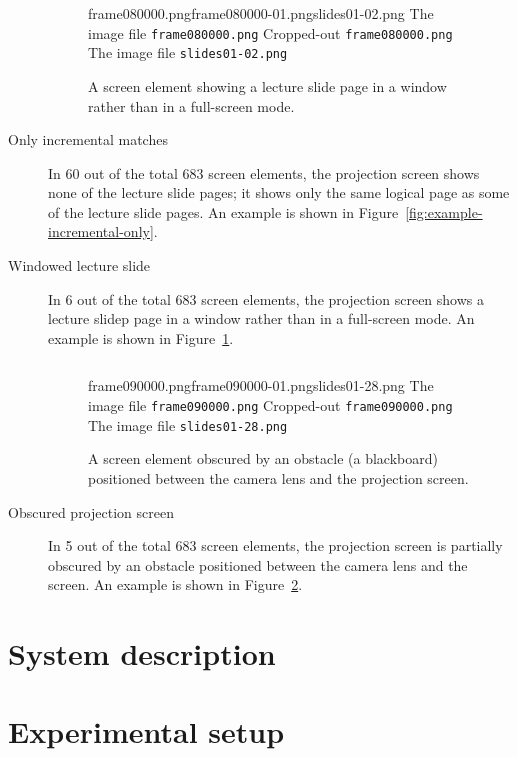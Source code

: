 \begin{description}
\begin{figure}
    \kern\floatsep
    \inputminted{xml}{fig/examples/windowed/example.xml}\par
      {frame080000.png}{frame080000-01.png}{slides01-02.png}%
      {The image file \texttt{frame080000.png}}%
      {Cropped-out \texttt{frame080000.png}}%
      {The image file \texttt{slides01-02.png}}
    \caption{A screen element showing a lecture slide page in a window rather
      than in a full-screen mode.}
    \label{fig:example-windowed}
  \end{figure}
  \item[Only incremental matches] In 60 out of the total 683 screen elements,
    the projection screen shows none of the lecture slide pages; it shows only
    the same logical page as some of the lecture slide pages. An example is
    shown in Figure~\ref{fig:example-incremental-only}.
  \item[Windowed lecture slide] In 6 out of the total 683 screen elements,
    the projection screen shows a lecture slidep page in a window rather than
    in a full-screen mode. An example is shown in
    Figure~\ref{fig:example-windowed}.

  \begin{figure}
    \inputminted{xml}{fig/examples/obstacle/example.xml}\par
      {frame090000.png}{frame090000-01.png}{slides01-28.png}%
      {The image file \texttt{frame090000.png}}%
      {Cropped-out \texttt{frame090000.png}}%
      {The image file \texttt{slides01-28.png}}
    \caption{A screen element obscured by an obstacle (a blackboard) positioned
      between the camera lens and the projection screen.}
    \label{fig:example-obstacle}
  \end{figure}
  \item[Obscured projection screen] In 5 out of the total 683 screen elements,
    the projection screen is partially obscured by an obstacle positioned
    between the camera lens and the screen. An example is shown in
    Figure~\ref{fig:example-obstacle}.
\end{description}

\section{System description}
\section{Experimental setup}
